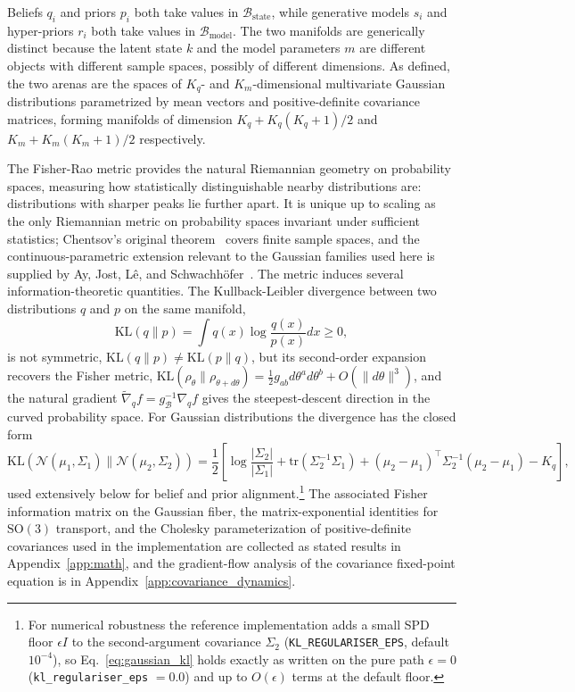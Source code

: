 \documentclass[11pt]{article}
\begin{document}
Beliefs $q_i$ and priors $p_i$ both take values in $\mathcal{B}_{\mathrm{state}}$, while generative models $s_i$ and hyper-priors $r_i$ both take values in $\mathcal{B}_{\mathrm{model}}$. The two manifolds are generically distinct because the latent state $k$ and the model parameters $m$ are different objects with different sample spaces, possibly of different dimensions. As defined, the two arenas are the spaces of $K_q$- and $K_m$-dimensional multivariate Gaussian distributions parametrized by mean vectors and positive-definite covariance matrices, forming manifolds of dimension $K_q + K_q(K_q+1)/2$ and $K_m + K_m(K_m+1)/2$ respectively.

The Fisher-Rao metric provides the natural Riemannian geometry on probability spaces, measuring how statistically distinguishable nearby distributions are: distributions with sharper peaks lie further apart. It is unique up to scaling as the only Riemannian metric on probability spaces invariant under sufficient statistics; Chentsov's original theorem~\cite{Cencov1982} covers finite sample spaces, and the continuous-parametric extension relevant to the Gaussian families used here is supplied by Ay, Jost, L\^{e}, and Schwachh\"{o}fer~\cite{AyJostLeSchwachhofer2017}. The metric induces several information-theoretic quantities. The Kullback-Leibler divergence between two distributions $q$ and $p$ on the same manifold,
\begin{equation}
\mathrm{KL}(q \| p) = \int q(x) \log\frac{q(x)}{p(x)} dx \geq 0,
\end{equation}
is not symmetric, $\mathrm{KL}(q \| p) \neq \mathrm{KL}(p \| q)$, but its second-order expansion recovers the Fisher metric, $\mathrm{KL}(\rho_\theta \| \rho_{\theta+d\theta}) = \tfrac{1}{2} g_{ab} d\theta^a d\theta^b + O(\|d\theta\|^3)$, and the natural gradient $\tilde{\nabla}_q f = g^{-1}_{\mathcal{B}} \nabla_q f$ gives the steepest-descent direction in the curved probability space. For Gaussian distributions the divergence has the closed form
\begin{equation}
\mathrm{KL}(\mathcal{N}(\mu_1, \Sigma_1) \| \mathcal{N}(\mu_2, \Sigma_2)) = \frac{1}{2}\left[\log\frac{|\Sigma_2|}{|\Sigma_1|} + \mathrm{tr}(\Sigma_2^{-1}\Sigma_1) + (\mu_2 - \mu_1)^\top\Sigma_2^{-1}(\mu_2 - \mu_1) - K_q\right],
\label{eq:gaussian_kl}
\end{equation}
used extensively below for belief and prior alignment.\footnote{For numerical robustness the reference implementation adds a small SPD floor $\epsilon I$ to the second-argument covariance $\Sigma_2$ (\texttt{KL\_REGULARISER\_EPS}, default $10^{-4}$), so Eq.~\eqref{eq:gaussian_kl} holds exactly as written on the pure path $\epsilon = 0$ (\texttt{kl\_regulariser\_eps} $= 0.0$) and up to $O(\epsilon)$ terms at the default floor.} The associated Fisher information matrix on the Gaussian fiber, the matrix-exponential identities for $\mathrm{SO}(3)$ transport, and the Cholesky parameterization of positive-definite covariances used in the implementation are collected as stated results in Appendix~\ref{app:math}, and the gradient-flow analysis of the covariance fixed-point equation is in Appendix~\ref{app:covariance_dynamics}.
\end{document}
